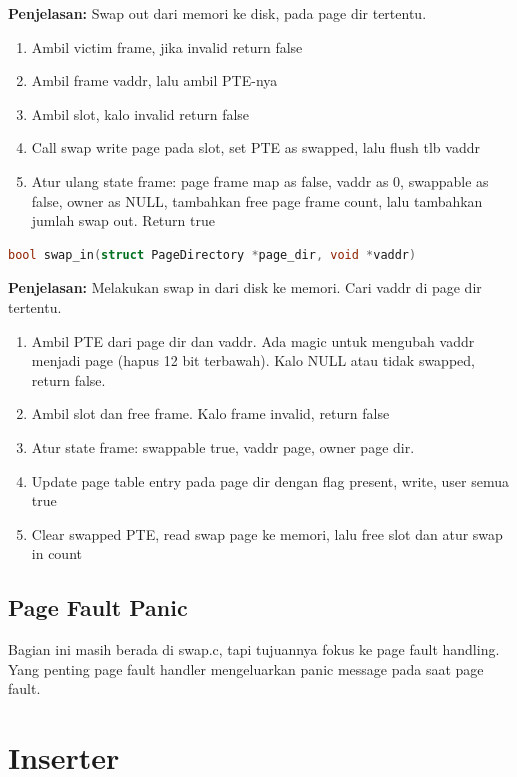 \textbf{Penjelasan:} Swap out dari memori ke disk, pada page dir tertentu. 
\begin{enumerate}
    \item Ambil victim frame, jika invalid return false
    \item Ambil frame vaddr, lalu ambil PTE-nya
    \item Ambil slot, kalo invalid return false
    \item Call swap write page pada slot, set PTE as swapped, lalu flush tlb vaddr
    \item Atur ulang state frame: page frame map as false, vaddr as 0, swappable as false, owner as NULL, tambahkan free page frame count, lalu tambahkan jumlah swap out. Return true
\end{enumerate}

\begin{lstlisting}[language=c]
    bool swap_in(struct PageDirectory *page_dir, void *vaddr)
\end{lstlisting}

\textbf{Penjelasan:} Melakukan swap in dari disk ke memori. Cari vaddr di page dir tertentu.

\begin{enumerate}
    \item Ambil PTE dari page dir dan vaddr. Ada magic untuk mengubah vaddr menjadi page (hapus 12 bit terbawah). Kalo NULL atau tidak swapped, return false.
    \item Ambil slot dan free frame. Kalo frame invalid, return false
    \item Atur state frame: swappable true, vaddr page, owner page dir.
    \item Update page table entry pada page dir dengan flag present, write, user semua true
    \item Clear swapped PTE, read swap page ke memori, lalu free slot dan atur swap in count
\end{enumerate}

\subsection{Page Fault Panic}

Bagian ini masih berada di swap.c, tapi tujuannya fokus ke page fault handling. Yang penting page fault handler mengeluarkan panic message pada saat page fault.

\section{Inserter}


